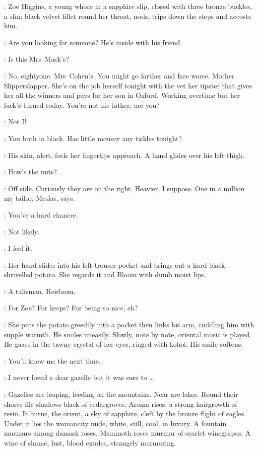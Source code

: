 :
Zoe Higgins, a young whore in a sapphire slip,
closed with three bronze buckles, a slim black velvet fillet round her throat,
nods, trips down the steps and accosts him.

\Zoe:
Are you looking for someone?
He's inside with his friend.

\Bloom:
Is this Mrs~Mack's?

\Zoe:
No, eightyone.
Mrs~Cohen's.
You might go farther and fare worse.
Mother Slipperslapper.
She's on the job herself tonight with the vet
her tipster that gives her all the winners and pays for her son in Oxford.
Working overtime but her luck's turned today.
You're not his father, are you?

\Bloom:
Not I!

\Zoe:
You both in black.
Has little mousey any tickles tonight?

:
His skin, alert, feels her fingertips approach.
A hand glides over his left thigh.

\Zoe:
How's the nuts?

\Bloom:
Off side.
Curiously they are on the right.
Heavier, I suppose.
One in a million my tailor, Mesias, says.

\Zoe:
You've a hard chancre.

\Bloom:
Not likely.

\Zoe:
I feel it.

:
Her hand slides into his left trouser pocket
and brings out a hard black shrivelled potato.
She regards it and Bloom with dumb moist lips.

\Bloom:
A talisman.
Heirloom.

\Zoe:
For Zoe?
For keeps?
For being so nice, eh?

:
She puts the potato greedily into a pocket then links his arm,
cuddling him with supple warmth.
He smiles uneasily.
Slowly, note by note, oriental music is played.
He gazes in the tawny crystal of her eyes, ringed with kohol.
His smile softens.

\Zoe:
You'll know me the next time.

\Bloom:
I never loved a dear gazelle but it was sure to \ldots

:
Gazelles are leaping, feeding on the mountains.
Near are lakes.
Round their shores file shadows black of cedargroves.
Aroma rises, a strong hairgrowth of resin.
It burns, the orient, a sky of sapphire, cleft by the bronze flight of eagles.
Under it lies the womancity nude, white, still, cool, in luxury.
A fountain murmurs among damask roses.
Mammoth roses murmur of scarlet winegrapes.
A wine of shame, lust, blood exudes, strangely murmuring.%

